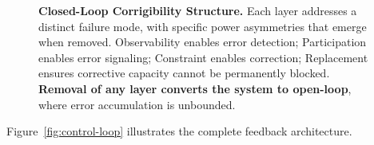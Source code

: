 \documentclass{article}
\begin{document}
\begin{figure}[htbp]
\caption{\textbf{Closed-Loop Corrigibility Structure.} Each layer addresses a distinct failure mode, with specific power asymmetries that emerge when removed. Observability enables error detection; Participation enables error signaling; Constraint enables correction; Replacement ensures corrective capacity cannot be permanently blocked. \textbf{Removal of any layer converts the system to open-loop}, where error accumulation is unbounded.}
\label{fig:four-layers}
\end{figure}

Figure~\ref{fig:control-loop} illustrates the complete feedback architecture.
\end{document}
